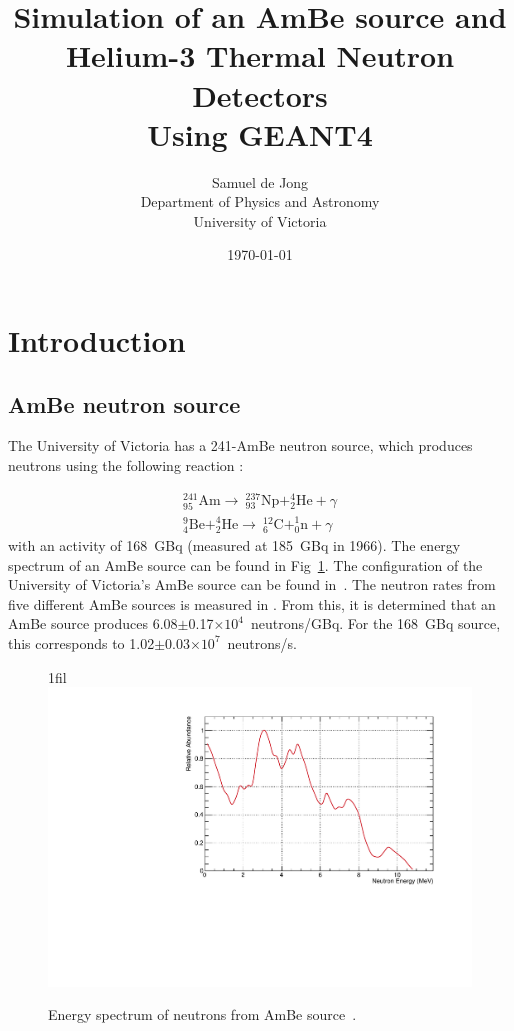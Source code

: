 \documentclass{article}
\title{Simulation of an AmBe source and Helium-3 Thermal Neutron Detectors\\ \vspace{2 mm} {\large Using GEANT4}}
\author{Samuel de Jong \\
	Department of Physics and Astronomy \\
	University of Victoria  \\
	}
\date{\today}
\makeatletter
\newcommand*{\centerfloat}{%
  \parindent \z@
  \leftskip \z@ \@plus 1fil \@minus \textwidth
  \rightskip\leftskip
  \parfillskip \z@skip}
\makeatother
\begin{document}
\maketitle

\section{Introduction}

\subsection{AmBe neutron source}
	The University of Victoria has a 241-AmBe neutron source, which produces neutrons using the following reaction \cite{barschall1983neutron}:

\begin{subequations}
\begin{align}
		{^{241}_{95}\mathrm{Am}\rightarrow~^{237}_{93}\mathrm{Np} + ^4_2\mathrm{He} + \gamma}\\
		{^9_4\mathrm{Be}+^4_2\mathrm{He}\rightarrow~^{12}_6\mathrm{C}+^1_0\mathrm{n}+\gamma}
\end{align}
\end{subequations}
with an activity of 168~GBq (measured at 185~GBq in 1966). The energy spectrum of an AmBe source can be found in Fig~\ref{fig:AmBeSpec}. The configuration of the University of Victoria's AmBe source can be found in~\cite{hargrove}. The neutron rates from five different AmBe sources is measured in \cite{lebreton2007experimental}. From this, it is determined that an AmBe source produces 6.08$\pm$0.17$\times10^{4}$~neutrons/GBq. For the 168~GBq source, this corresponds to 1.02$\pm$0.03$\times10^{7}$~neutrons/s.

\begin{figure}
	\centerfloat
		\includegraphics[trim={0 0 0 0.75cm},clip, width=\columnwidth]{images/AmBe_NeutronSpectrum.pdf}
	\caption[Energy spectrum of neutrons from AmBe source]{Energy spectrum of neutrons from AmBe source~\cite{AmBeSpec}.}
	\label{fig:AmBeSpec}
\end{figure}
\end{document}
